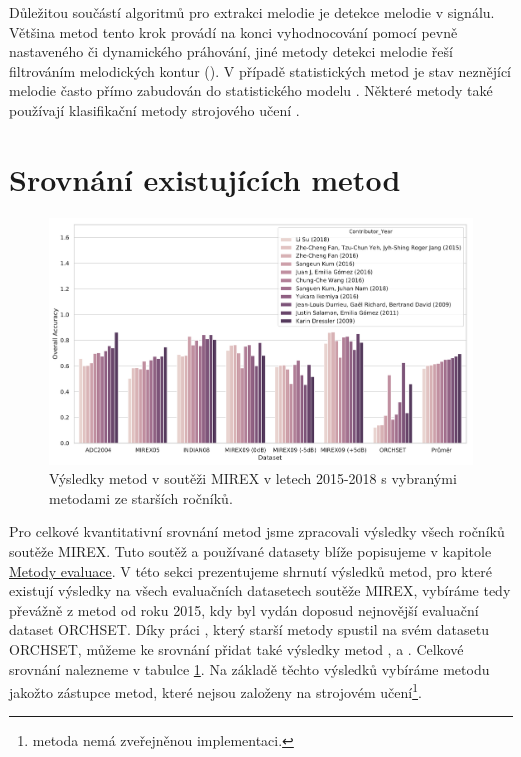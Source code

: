 Důležitou součástí algoritmů pro extrakci melodie je detekce melodie v signálu. Většina metod tento krok provádí na konci vyhodnocování pomocí pevně nastaveného či dynamického práhování, jiné metody detekci melodie řeší filtrováním melodických kontur (\cite{Salamon2012a}). V případě statistických metod je stav neznějící melodie často přímo zabudován do statistického modelu \citep{Ryynanen2008}. Některé metody také používají klasifikační metody strojového učení \citep{Rigaud2016}.

\section{Srovnání existujících metod}

\begin{figure}[h]\centering
\includegraphics[width=\textwidth,height=\textheight,keepaspectratio]{../img/mirex_results}
\caption{Výsledky metod v soutěži MIREX v letech 2015-2018 s vybranými metodami ze starších ročníků.}
\label{obr:mirex_results}
\end{figure}
Pro celkové kvantitativní srovnání metod jsme zpracovali výsledky všech ročníků soutěže MIREX. Tuto soutěž a používané datasety blíže popisujeme v kapitole \hyperref[chap:evaluace]{Metody evaluace}. V této sekci prezentujeme shrnutí výsledků metod, pro které existují výsledky na všech evaluačních datasetech soutěže MIREX, vybíráme tedy převážně z metod od roku 2015, kdy byl vydán doposud nejnovější evaluační dataset ORCHSET. Díky práci \cite{Bosch2014}, který starší metody spustil na svém datasetu ORCHSET, můžeme ke srovnání přidat také výsledky metod \cite{Dressler2009}, \cite{Salamon2012a} a \cite{Durrieu2010}. Celkové srovnání nalezneme v tabulce \ref{obr:mirex_results}. Na základě těchto výsledků vybíráme metodu \cite{Salamon2012a} jakožto zástupce metod, které nejsou založeny na strojovém učení\footnote{metoda \cite{Dressler2009} nemá zveřejněnou implementaci.}.

